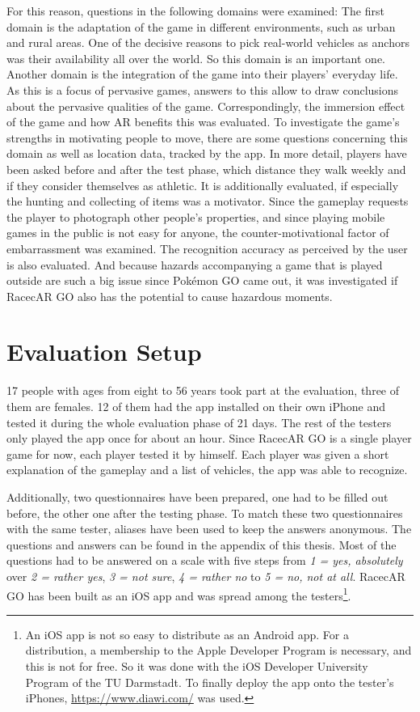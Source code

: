For this reason, questions in the following domains were examined: The first domain is the adaptation of the game in different environments, such as urban and rural areas. One of the decisive reasons to pick real-world vehicles as anchors was their availability all over the world. So this domain is an important one. Another domain is the integration of the game into their players' everyday life. As this is a focus of pervasive games, answers to this allow to draw conclusions about the pervasive qualities of the game. Correspondingly, the immersion effect of the game and how AR benefits this was evaluated. To investigate the game's strengths in motivating people to move, there are some questions concerning this domain as well as location data, tracked by the app. In more detail, players have been asked before and after the test phase, which distance they walk weekly and if they consider themselves as athletic. It is additionally evaluated, if especially the hunting and collecting of items was a motivator. Since the gameplay requests the player to photograph other people's properties, and since playing mobile games in the public is not easy for anyone, the counter-motivational factor of embarrassment was examined. The recognition accuracy as perceived by the user is also evaluated. And because hazards accompanying a game that is played outside are such a big issue since Pok\'{e}mon GO came out, it was investigated if RacecAR GO also has the potential to cause hazardous moments.

\section{Evaluation Setup}
17 people with ages from eight to 56 years took part at the evaluation, three of them are females. 12 of them had the app installed on their own iPhone and tested it during the whole evaluation phase of 21 days. The rest of the testers only played the app once for about an hour. Since RacecAR GO is a single player game for now, each player tested it by himself. Each player was given a short explanation of the gameplay and a list of vehicles, the app was able to recognize.

Additionally, two questionnaires have been prepared, one had to be filled out before, the other one after the testing phase. To match these two questionnaires with the same tester, aliases have been used to keep the answers anonymous. The questions and answers can be found in the appendix of this thesis. Most of the questions had to be answered on a scale with five steps from \emph{1 = yes, absolutely} over \emph{2 = rather yes}, \emph{3 = not sure}, \emph{4 = rather no} to \emph{5 = no, not at all}. RacecAR GO has been built as an iOS app and was spread among the testers\footnote{An iOS app is not so easy to distribute as an Android app. For a distribution, a membership to the Apple Developer Program is necessary, and this is not for free. So it was done with the iOS Developer University Program of the TU Darmstadt. To finally deploy the app onto the tester's iPhones, \url{https://www.diawi.com/} was used.}.

